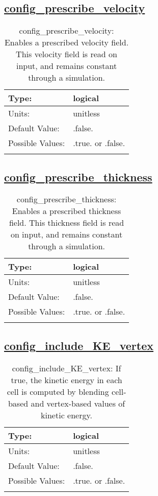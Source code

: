 \subsection[config\_prescribe\_velocity]{\hyperref[sec:nm_tab_debug]{config\_prescribe\_velocity}}
\label{subsec:nm_sec_config_prescribe_velocity}
\begin{center}
\begin{longtable}{| p{2.0in} || p{4.0in} |}
    \hline
    Type: & logical \\
    \hline
    Units: & \si{unitless} \\
    \hline
    Default Value: & .false. \\
    \hline
    Possible Values: & .true. or .false. \\
    \hline
    \caption{config\_prescribe\_velocity: Enables a prescribed velocity field. This velocity field is read on input, and remains constant through a simulation.}
\end{longtable}
\end{center}
\subsection[config\_prescribe\_thickness]{\hyperref[sec:nm_tab_debug]{config\_prescribe\_thickness}}
\label{subsec:nm_sec_config_prescribe_thickness}
\begin{center}
\begin{longtable}{| p{2.0in} || p{4.0in} |}
    \hline
    Type: & logical \\
    \hline
    Units: & \si{unitless} \\
    \hline
    Default Value: & .false. \\
    \hline
    Possible Values: & .true. or .false. \\
    \hline
    \caption{config\_prescribe\_thickness: Enables a prescribed thickness field. This thickness field is read on input, and remains constant through a simulation.}
\end{longtable}
\end{center}
\subsection[config\_include\_KE\_vertex]{\hyperref[sec:nm_tab_debug]{config\_include\_KE\_vertex}}
\label{subsec:nm_sec_config_include_KE_vertex}
\begin{center}
\begin{longtable}{| p{2.0in} || p{4.0in} |}
    \hline
    Type: & logical \\
    \hline
    Units: & \si{unitless} \\
    \hline
    Default Value: & .false. \\
    \hline
    Possible Values: & .true. or .false. \\
    \hline
    \caption{config\_include\_KE\_vertex: If true, the kinetic energy in each cell is computed by blending cell-based and vertex-based values of kinetic energy.}
\end{longtable}
\end{center}

